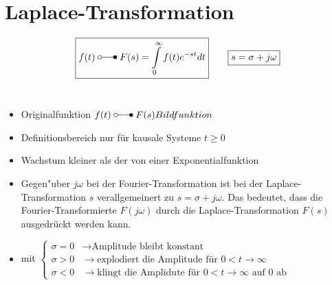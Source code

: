 
\section{Laplace-Transformation}
	$$\boxed{f(t) \; \laplace \; F(s)=\int\limits_0^\infty f(t)e^{-st}dt} \qquad \boxed{ s=\sigma+j\omega}$$\\
	\begin{itemize}
		\item Originalfunktion $ f(t) \; \laplace \; F(s) Bildfunktion $ 
		\item Definitionsbereich nur für kausale Systeme $t\geq 0$
		\item  Wachstum kleiner als der von einer Exponentialfunktion
		\item  Gegen"uber $j\omega$ bei der Fourier-Transformation ist bei der
			Laplace-Transformation $s$ verallgemeinert zu $s=\sigma + j\omega$. Das
			bedeutet, dass die Fourier-Transformierte $F(j\omega)$ durch die
			Laplace-Transformation $F(s)$ ausgedr\"uckt werden kann.
		\item  mit 
		$\begin{cases} 
		\sigma = 0 & \rightarrow \text{Amplitude bleibt konstant} \\ 
		\sigma > 0 & \rightarrow \text{explodiert die Amplitude f\"ur } 0 < t \rightarrow \infty \\
		\sigma < 0 & \rightarrow \text{klingt die Amplidute für } 0 < t \rightarrow \infty \text{ auf $0$ ab} \
		 \end{cases} $ \\   
	\end{itemize}
	
